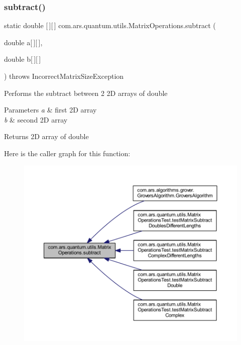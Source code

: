 \subsubsection{\texorpdfstring{subtract()}{subtract()}\hspace{0.1cm}{\footnotesize\ttfamily [1/2]}}
{\footnotesize\ttfamily static double \mbox{[}$\,$\mbox{]}\mbox{[}$\,$\mbox{]} com.\+ars.\+quantum.\+utils.\+Matrix\+Operations.\+subtract (\begin{DoxyParamCaption}\item[{double}]{a\mbox{[}$\,$\mbox{]}\mbox{[}$\,$\mbox{]},  }\item[{double}]{b\mbox{[}$\,$\mbox{]}\mbox{[}$\,$\mbox{]} }\end{DoxyParamCaption}) throws Incorrect\+Matrix\+Size\+Exception\hspace{0.3cm}{\ttfamily [static]}}

Performs the subtract between 2 2D arrays of double


\begin{DoxyParams}{Parameters}
{\em a} & first 2D array \\
\hline
{\em b} & second 2D array \\
\hline
\end{DoxyParams}
\begin{DoxyReturn}{Returns}
2D array of double 
\end{DoxyReturn}
Here is the caller graph for this function\+:
\nopagebreak
\begin{figure}[H]
\begin{center}
\leavevmode
\includegraphics[width=350pt]{classcom_1_1ars_1_1quantum_1_1utils_1_1_matrix_operations_a7ccc1120dba8158f6cb778ad6a55927d_icgraph}
\end{center}
\end{figure}
\hypertarget{classcom_1_1ars_1_1quantum_1_1utils_1_1_matrix_operations_a99b64f57485b148b298a3a7e08c002f6}{}\label{classcom_1_1ars_1_1quantum_1_1utils_1_1_matrix_operations_a99b64f57485b148b298a3a7e08c002f6} 
